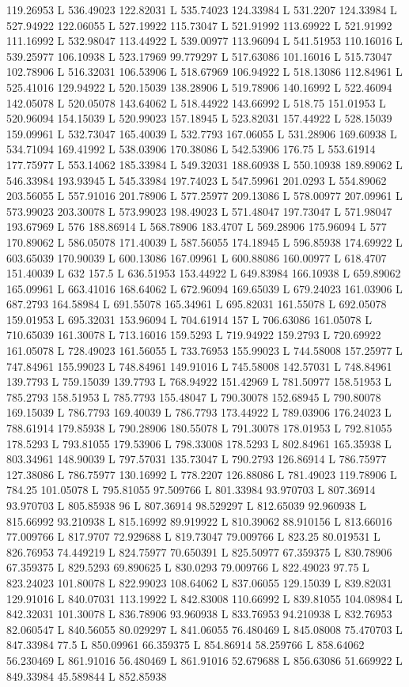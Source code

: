 {\begin{scope}[local bounding box=bb]
{119.26953 L 536.49023 122.82031 L 535.74023 124.33984 L 531.2207 124.33984 L 527.94922 122.06055 L 527.19922 115.73047 L 521.91992 113.69922 L 521.91992 111.16992 L 532.98047 113.44922 L 539.00977 113.96094 L 541.51953 110.16016 L 539.25977 106.10938 L 523.17969 99.779297 L 517.63086 101.16016 L 515.73047 102.78906 L 516.32031 106.53906 L 518.67969 106.94922 L 518.13086 112.84961 L 525.41016 129.94922 L 520.15039 138.28906 L 519.78906 140.16992 L 522.46094 142.05078 L 520.05078 143.64062 L 518.44922 143.66992 L 518.75 151.01953 L 520.96094 154.15039 L 520.99023 157.18945 L 523.82031 157.44922 L 528.15039 159.09961 L 532.73047 165.40039 L 532.7793 167.06055 L 531.28906 169.60938 L 534.71094 169.41992 L 538.03906 170.38086 L 542.53906 176.75 L 553.61914 177.75977 L 553.14062 185.33984 L 549.32031 188.60938 L 550.10938 189.89062 L 546.33984 193.93945 L 545.33984 197.74023 L 547.59961 201.0293 L 554.89062 203.56055 L 557.91016 201.78906 L 577.25977 209.13086 L 578.00977 207.09961 L 573.99023 203.30078 L 573.99023 198.49023 L 571.48047 197.73047 L 571.98047 193.67969 L 576 188.86914 L 568.78906 183.4707 L 569.28906 175.96094 L 577 170.89062 L 586.05078 171.40039 L 587.56055 174.18945 L 596.85938 174.69922 L 603.65039 170.90039 L 600.13086 167.09961 L 600.88086 160.00977 L 618.4707 151.40039 L 632 157.5 L 636.51953 153.44922 L 649.83984 166.10938 L 659.89062 165.09961 L 663.41016 168.64062 L 672.96094 169.65039 L 679.24023 161.03906 L 687.2793 164.58984 L 691.55078 165.34961 L 695.82031 161.55078 L 692.05078 159.01953 L 695.32031 153.96094 L 704.61914 157 L 706.63086 161.05078 L 710.65039 161.30078 L 713.16016 159.5293 L 719.94922 159.2793 L 720.69922 161.05078 L 728.49023 161.56055 L 733.76953 155.99023 L 744.58008 157.25977 L 747.84961 155.99023 L 748.84961 149.91016 L 745.58008 142.57031 L 748.84961 139.7793 L 759.15039 139.7793 L 768.94922 151.42969 L 781.50977 158.51953 L 785.2793 158.51953 L 785.7793 155.48047 L 790.30078 152.68945 L 790.80078 169.15039 L 786.7793 169.40039 L 786.7793 173.44922 L 789.03906 176.24023 L 788.61914 179.85938 L 790.28906 180.55078 L 791.30078 178.01953 L 792.81055 178.5293 L 793.81055 179.53906 L 798.33008 178.5293 L 802.84961 165.35938 L 803.34961 148.90039 L 797.57031 135.73047 L 790.2793 126.86914 L 786.75977 127.38086 L 786.75977 130.16992 L 778.2207 126.88086 L 781.49023 119.78906 L 784.25 101.05078 L 795.81055 97.509766 L 801.33984 93.970703 L 807.36914 93.970703 L 805.85938 96 L 807.36914 98.529297 L 812.65039 92.960938 L 815.66992 93.210938 L 815.16992 89.919922 L 810.39062 88.910156 L 813.66016 77.009766 L 817.9707 72.929688 L 819.73047 79.009766 L 823.25 80.019531 L 826.76953 74.449219 L 824.75977 70.650391 L 825.50977 67.359375 L 830.78906 67.359375 L 829.5293 69.890625 L 830.0293 79.009766 L 822.49023 97.75 L 823.24023 101.80078 L 822.99023 108.64062 L 837.06055 129.15039 L 839.82031 129.91016 L 840.07031 113.19922 L 842.83008 110.66992 L 839.81055 104.08984 L 842.32031 101.30078 L 836.78906 93.960938 L 833.76953 94.210938 L 832.76953 82.060547 L 840.56055 80.029297 L 841.06055 76.480469 L 845.08008 75.470703 L 847.33984 77.5 L 850.09961 66.359375 L 854.86914 58.259766 L 858.64062 56.230469 L 861.91016 56.480469 L 861.91016 52.679688 L 856.63086 51.669922 L 849.33984 45.589844 L 852.85938 }
\end{scope}}
